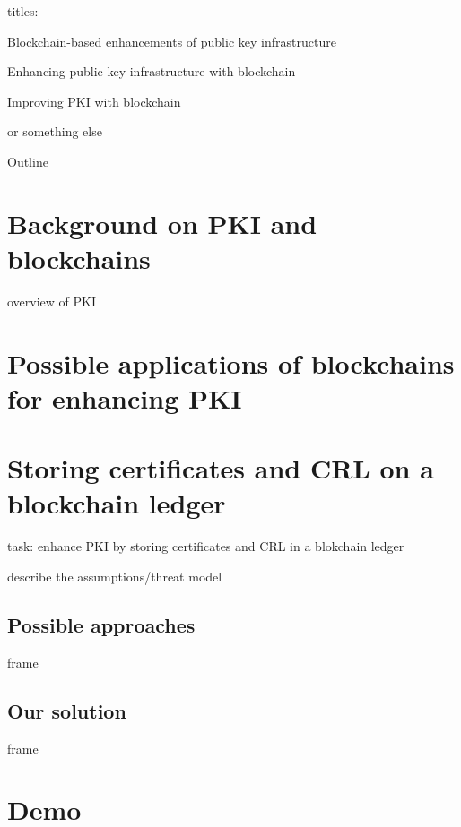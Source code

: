 \documentclass[11pt]{beamer}
\begin{document}
\begin{frame}
titles:

Blockchain-based enhancements of public key infrastructure

Enhancing public key infrastructure with blockchain

Improving PKI with blockchain

or something else
\end{frame}

\begin{frame}{Outline}
\tableofcontents
\end{frame}

\section[sec1]{Background on PKI and blockchains}

\begin{frame}
overview of PKI
\end{frame}


\section[sec2]{Possible applications of blockchains for enhancing PKI}


\section[sec3]{Storing certificates and CRL on a blockchain ledger}

\begin{frame}
task: enhance PKI by storing certificates
and CRL
in a blokchain ledger

describe the assumptions/threat model
\end{frame}

\subsection[subsec1]{Possible approaches}

\begin{frame}
frame
\end{frame}

\subsection[subsec2]{Our solution}

\begin{frame}
frame
\end{frame}

\section[sec4]{Demo}
\end{document}
